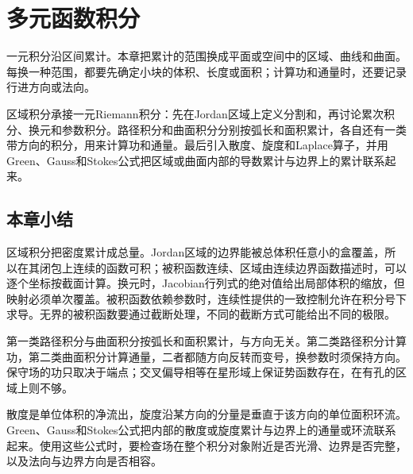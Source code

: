 \chapter{多元函数积分}
\label{chap:multivariate-integration}

一元积分沿区间累计。本章把累计的范围换成平面或空间中的区域、曲线和曲面。每换一种范围，都要先确定小块的体积、长度或面积；计算功和通量时，还要记录行进方向或法向。

区域积分承接一元Riemann积分：先在Jordan区域上定义分割和，再讨论累次积分、换元和参数积分。路径积分和曲面积分分别按弧长和面积累计，各自还有一类带方向的积分，用来计算功和通量。最后引入散度、旋度和Laplace算子，并用Green、Gauss和Stokes公式把区域或曲面内部的导数累计与边界上的累计联系起来。






\FloatBarrier
\section{本章小结}
\label{sec:multivariable-summary}

区域积分把密度累计成总量。Jordan区域的边界能被总体积任意小的盒覆盖，所以在其闭包上连续的函数可积；被积函数连续、区域由连续边界函数描述时，可以逐个坐标按截面计算。换元时，Jacobian行列式的绝对值给出局部体积的缩放，但映射必须单次覆盖。被积函数依赖参数时，连续性提供的一致控制允许在积分号下求导。无界的被积函数要通过截断处理，不同的截断方式可能给出不同的极限。

第一类路径积分与曲面积分按弧长和面积累计，与方向无关。第二类路径积分计算功，第二类曲面积分计算通量，二者都随方向反转而变号，换参数时须保持方向。保守场的功只取决于端点；交叉偏导相等在星形域上保证势函数存在，在有孔的区域上则不够。

散度是单位体积的净流出，旋度沿某方向的分量是垂直于该方向的单位面积环流。Green、Gauss和Stokes公式把内部的散度或旋度累计与边界上的通量或环流联系起来。使用这些公式时，要检查场在整个积分对象附近是否光滑、边界是否完整，以及法向与边界方向是否相容。
